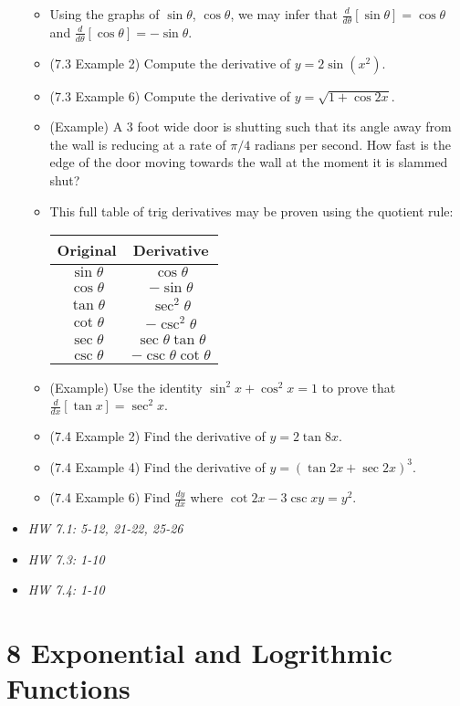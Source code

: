 \documentclass[11pt]{article}
\begin{document}
\begin{itemize}
  \begin{itemize}
    \item Using the graphs of \(\sin\theta\), \(\cos\theta\), we may infer
    that \(\frac{d}{d\theta}[\sin\theta]=\cos\theta\) and
    \(\frac{d}{d\theta}[\cos\theta]=-\sin\theta\).
    \item (7.3 Example 2) Compute the derivative of \(y=2\sin(x^2)\).
    \item (7.3 Example 6) Compute the derivative of \(y=\sqrt{1+\cos 2x}\).
    \item (Example) A \(3\) foot wide
          door is shutting such that its angle away from the
          wall is reducing at a rate of \(\pi/4\) radians per second. How fast
          is the edge of the door moving towards the wall at the moment
          it is slammed shut?
    \item This full table of trig derivatives may be proven using the
          quotient rule: \\
      \begin{tabular}{c|c}
        Original & Derivative \\\hline
        \(\sin\theta\) & \(\cos\theta\) \\
        \(\cos\theta\) & \(-\sin\theta\) \\
        \(\tan\theta\) & \(\sec^2\theta\) \\
        \(\cot\theta\) & \(-\csc^2\theta\) \\
        \(\sec\theta\) & \(\sec\theta\tan\theta\) \\
        \(\csc\theta\) & \(-\csc\theta\cot\theta\)
      \end{tabular}
    \item (Example) Use the identity \(\sin^2x+\cos^2x = 1\) to
          prove that \(\frac{d}{dx}[\tan x]=\sec^2 x\).
    \item (7.4 Example 2) Find the derivative of \(y=2\tan 8x\).
    \item (7.4 Example 4) Find the derivative of \(y=(\tan 2x+\sec 2x)^3\).
    \item (7.4 Example 6) Find \(\frac{dy}{dx}\) where
          \(\cot 2x - 3\csc xy = y^2\).
  \end{itemize}
\item\textit{
  HW 7.1: 5-12, 21-22, 25-26
}
\item\textit{
  HW 7.3: 1-10
}
\item\textit{
  HW 7.4: 1-10
}
\end{itemize}

\section*{8 Exponential and Logrithmic Functions}
\end{document}
